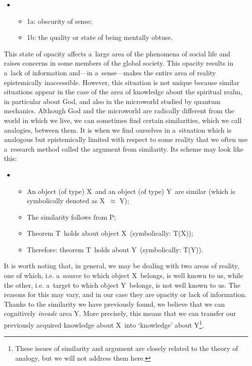 \begin{itemize}
\item \begin{itemize}
\item 1a: obscurity of sense;
\item 1b: the quality or state of being mentally obtuse.
\end{itemize}
\end{itemize}
This state of opacity affects a~large area of the phenomena of social life and raises concerns in some members of the global society. This opacity results in a~lack of information and—in a~sense—makes the entire area of reality epistemically inaccessible. However, this situation is not unique because similar situations appear in the case of the area of knowledge about the spiritual realm, in particular about God, and also in the microworld studied by quantum mechanics. Although God and the microworld are radically different from the world in which we live, we can sometimes find certain similarities, which we call analogies, between them. It is when we find ourselves in a~situation which is analogous but epistemically limited with respect to some reality that we often use a~research method called the argument from similarity. Its scheme may look like this:

\begin{itemize}
\item \begin{itemize}
\item An object (of type) X~and an object (of type) Y~are similar (which is symbolically denoted as X~${\approx}$ Y);
\item The similarity follows from P;
\item Theorem T~holds about object X~(symbolically: T(X));
\item Therefore: theorem T~holds about Y~(symbolically: T(Y)).
\end{itemize}
\end{itemize}
It is worth noting that, in general, we may be dealing with two areas of reality, one of which, i.e. a~source to which object X~belongs, is well known to us, while the other, i.e. a~target to which object Y~belongs, is not well known to us. The reasons for this may vary, and in our case they are opacity or lack of information. Thanks to the similarity we have previously found, we believe that we can cognitively \textit{invade} area Y. More precisely, this means that we can transfer our previously acquired knowledge about X~into ‘knowledge' about Y\footnote{ These issues of similarity and argument are closely related to the theory of analogy, but we will not address them here.}.

